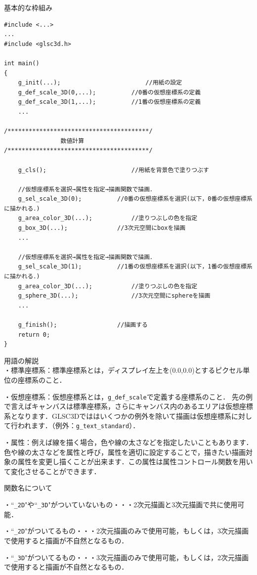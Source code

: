 \documentclass[platex,a4paper,12pt]{jsarticle}%
\begin{document}
\newpage
基本的な枠組み
\begin{verbatim}
#include <...>
...
#include <glsc3d.h>

int main()
{
    g_init(...);						//用紙の設定
    g_def_scale_3D(0,...);			//0番の仮想座標系の定義
    g_def_scale_3D(1,...);			//1番の仮想座標系の定義
    ...
        
/****************************************/	
                数値計算
/****************************************/

    g_cls();						//用紙を背景色で塗りつぶす
   
    //仮想座標系を選択→属性を指定→描画関数で描画．
    g_sel_scale_3D(0);			//0番の仮想座標系を選択(以下，0番の仮想座標系に描かれる．)	
    g_area_color_3D(...);			//塗りつぶしの色を指定
    g_box_3D(...);				//3次元空間にboxを描画
    ...
    
    //仮想座標系を選択→属性を指定→描画関数で描画．
    g_sel_scale_3D(1);			//1番の仮想座標系を選択(以下，1番の仮想座標系に描かれる．)
    g_area_color_3D(...);			//塗りつぶしの色を指定
    g_sphere_3D(...);				//3次元空間にsphereを描画
    ...
           
    g_finish();					//描画する
    return 0;
}

\end{verbatim}
用語の解説\\
\noindent
・標準座標系：標準座標系とは，ディスプレイ左上を(0.0,0.0)とするピクセル単位の座標系のこと．

\noindent
・仮想座標系：仮想座標系とは，\verb|g_def_scale|で定義する座標系のこと．
先の例で言えばキャンバスは標準座標系，さらにキャンバス内のあるエリアは仮想座標系となります．GLSC3Dでははいくつかの例外を除いて描画は仮想座標系に対して行われます．（例外：\verb|g_text_standard|）．

\noindent
・属性：例えば線を描く場合，色や線の太さなどを指定したいこともあります．色や線の太さなどを属性と呼び，属性を適切に設定することで，描きたい描画対象の属性を変更し描くことが出来ます．この属性は属性コントロール関数を用いて変化させることができます．

\vspace{5mm}
\noindent
関数名について

\noindent
・``\verb|_2D|"や``\verb|_3D|"がついていないもの・・・2次元描画と3次元描画で共に使用可能．

\noindent
・``\verb|_2D|"がついてるもの・・・2次元描画のみで使用可能，もしくは，3次元描画で使用すると描画が不自然となるもの．

\noindent
・``\verb|_3D|"がついてるもの・・・3次元描画のみで使用可能，もしくは，2次元描画で使用すると描画が不自然となるもの．
\end{document}
